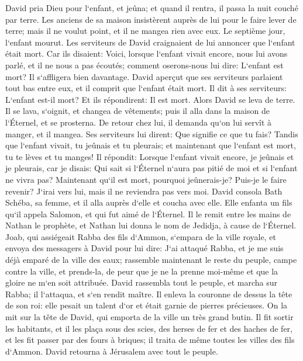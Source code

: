\verse David pria Dieu pour l`enfant, et jeûna; et quand il rentra, il passa la nuit couché par terre. 
\verse Les anciens de sa maison insistèrent auprès de lui pour le faire lever de terre; mais il ne voulut point, et il ne mangea rien avec eux. 
\verse Le septième jour, l`enfant mourut. Les serviteurs de David craignaient de lui annoncer que l`enfant était mort. Car ils disaient: Voici, lorsque l`enfant vivait encore, nous lui avons parlé, et il ne nous a pas écoutés; comment oserons-nous lui dire: L`enfant est mort? Il s`affligera bien davantage. 
\verse David aperçut que ses serviteurs parlaient tout bas entre eux, et il comprit que l`enfant était mort. Il dit à ses serviteurs: L`enfant est-il mort? Et ils répondirent: Il est mort. 
\verse Alors David se leva de terre. Il se lava, s`oignit, et changea de vêtements; puis il alla dans la maison de l`Éternel, et se prosterna. De retour chez lui, il demanda qu`on lui servît à manger, et il mangea. 
\verse Ses serviteurs lui dirent: Que signifie ce que tu fais? Tandis que l`enfant vivait, tu jeûnais et tu pleurais; et maintenant que l`enfant est mort, tu te lèves et tu manges! 
\verse Il répondit: Lorsque l`enfant vivait encore, je jeûnais et je pleurais, car je disais: Qui sait si l`Éternel n`aura pas pitié de moi et si l`enfant ne vivra pas? 
\verse Maintenant qu`il est mort, pourquoi jeûnerais-je? Puis-je le faire revenir? J`irai vers lui, mais il ne reviendra pas vers moi. 
\verse David consola Bath Schéba, sa femme, et il alla auprès d`elle et coucha avec elle. Elle enfanta un fils qu`il appela Salomon, et qui fut aimé de l`Éternel. 
\verse Il le remit entre les mains de Nathan le prophète, et Nathan lui donna le nom de Jedidja, à cause de l`Éternel. 
\verse Joab, qui assiégeait Rabba des fils d`Ammon, s`empara de la ville royale, 
\verse et envoya des messagers à David pour lui dire: J`ai attaqué Rabba, et je me suis déjà emparé de la ville des eaux; 
\verse rassemble maintenant le reste du peuple, campe contre la ville, et prends-la, de peur que je ne la prenne moi-même et que la gloire ne m`en soit attribuée. 
\verse David rassembla tout le peuple, et marcha sur Rabba; il l`attaqua, et s`en rendit maître. 
\verse Il enleva la couronne de dessus la tête de son roi: elle pesait un talent d`or et était garnie de pierres précieuses. On la mit sur la tête de David, qui emporta de la ville un très grand butin. 
\verse Il fit sortir les habitants, et il les plaça sous des scies, des herses de fer et des haches de fer, et les fit passer par des fours à briques; il traita de même toutes les villes des fils d`Ammon. David retourna à Jérusalem avec tout le peuple. 

